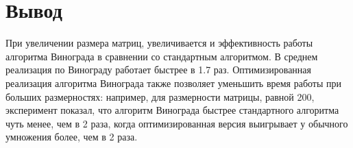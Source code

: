 \newpage

\section*{Вывод}
При увеличении размера матриц, увеличивается и эффективность работы алгоритма Винограда в сравнении со стандартным алгоритмом. В среднем реализация по Винограду работает быстрее в 1.7 раз. Оптимизированная реализация алгоритма Винограда также позволяет уменьшить время работы при больших размерностях: например, для размерности матрицы, равной 200, эксперимент показал, что алгоритм Винограда быстрее стандартного алгоритма чуть менее, чем в 2 раза, когда оптимизированная версия выигрывает у обычного умножения более, чем в 2 раза. 
